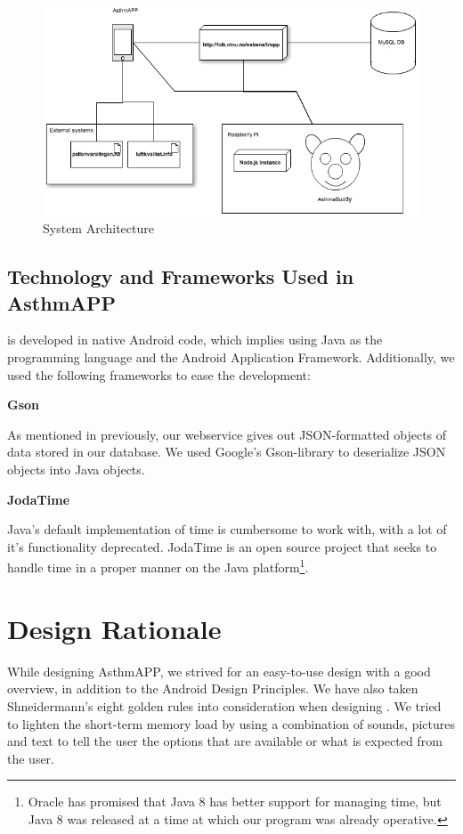 \begin{figure}
		\centering
			\includegraphics[width=0.60\paperwidth]{Pictures/system-architecture.png}
		\caption{System Architecture}
		\label{fig:basic-architecture}
\end{figure}

\subsection{Technology and Frameworks Used in AsthmAPP}
\label{sec:techandframeinapp}
\app{} is developed in native Android code, which implies using Java as the programming language and the Android Application Framework. Additionally, we used the following frameworks to ease the development: 

\textbf{Gson} 

As mentioned in previously, our webservice gives out JSON-formatted objects of data stored in our database. We used Google's Gson-library to deserialize JSON objects into Java objects.

\textbf{JodaTime} 

Java's default implementation of time is cumbersome to work with, with a lot of it's functionality deprecated. JodaTime is an open source project that seeks to handle time in a proper manner on the Java platform\footnote{Oracle has promised that Java 8 has better support for managing time, but Java 8 was released at a time at which our program was already operative.}.


\section{Design Rationale}
\label{sec:usability-affect-design}
While designing AsthmAPP, we strived for an easy-to-use design with a good overview, in addition to the Android Design Principles\cite{androiddesign}. We have also taken Shneidermann's eight golden rules into consideration when designing \app{}\cite{shneiderman2003designing}. 
We tried to lighten the short-term memory load by using a combination of sounds, pictures and text to tell the user the options that are available or what is expected from the user. 

